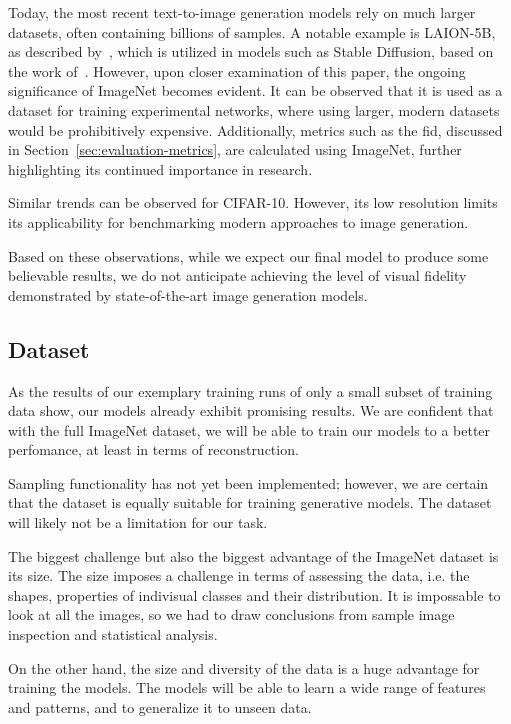 Today, the most recent text-to-image generation models rely on much larger datasets, often containing billions of samples.
A notable example is LAION-5B, as described by~\cite{laion5b}, which is utilized in models such as Stable
Diffusion, based on the work of~\cite{stable_diff}.
However, upon closer examination of this paper, the ongoing significance of ImageNet becomes evident.
It can be observed that it is used as a dataset for training experimental networks, where using larger, modern
datasets would be prohibitively expensive.
Additionally, metrics such as the \ac{fid}, discussed in Section~\ref{sec:evaluation-metrics}, are calculated using
ImageNet, further highlighting its continued importance in research.

Similar trends can be observed for CIFAR-10.
However, its low resolution limits its applicability for benchmarking modern approaches to image generation.

Based on these observations, while we expect our final model to produce some believable results, we do not anticipate
achieving the level of visual fidelity demonstrated by state-of-the-art image generation models.

\subsection{Dataset}
    As the results of our exemplary training runs of only a small subset of training data show, our models already exhibit promising results. We are confident that with the full ImageNet dataset, we will be able to train our models to a better perfomance, at least in terms of reconstruction.

    Sampling functionality has not yet been implemented; however, we are certain that the dataset is equally suitable for training generative models. The dataset will likely not be a limitation for our task.

    The biggest challenge but also the biggest advantage of the ImageNet dataset is its size. The size imposes a challenge in terms of assessing the data, i.e. the shapes, properties of indivisual classes and their distribution. It is impossable to look at all the images, so we had to draw conclusions from sample image inspection and statistical analysis.

    On the other hand, the size and diversity of the data is a huge advantage for training the models. The models will be able to learn a wide range of features and patterns, and to generalize it to unseen data.


